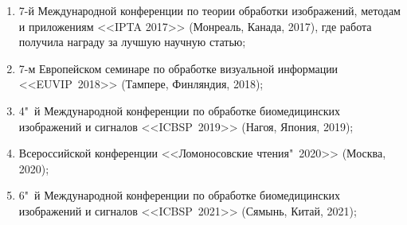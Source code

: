 \begin {enumerate}[beginpenalty=10000]
	\item 7-й Международной конференции по теории обработки изображений, методам и приложениям <<IPTA 2017>> (Монреаль, Канада, 2017), где работа получила награду за лучшую научную статью;
	
	\item 7-м Европейском семинаре по обработке визуальной информации <<EUVIP~2018>> (Тампере, Финляндия, 2018);
	
	\item 4"~й Международной конференции по обработке биомедицинских изображений и сигналов <<ICBSP~2019>> (Нагоя, Япония, 2019);
	
	\item Всероссийской конференции <<Ломоносовские чтения"~2020>> (Москва, 2020);
	
	\item 6"~й Международной конференции по обработке биомедицинских изображений и сигналов <<ICBSP~2021>> (Сямынь, Китай, 2021);
\end {enumerate}

